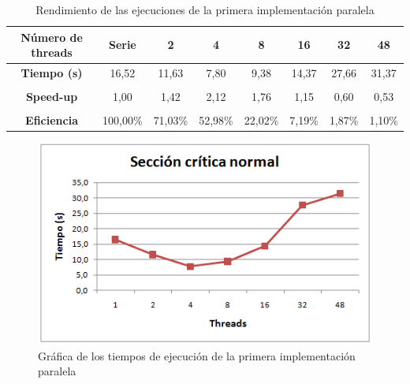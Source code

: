 \begin{table}[h]
	\small
	\centering
	\captionsetup{justification=centering}
	\begin{tabular}{cccccccc}
		\hline
		\multicolumn{1}{|c|}{{\bf N\'{u}mero de threads}} & \multicolumn{1}{c|}{{\bf Serie}} & \multicolumn{1}{c|}{{\bf 2}} & \multicolumn{1}{c|}{{\bf 4}} & \multicolumn{1}{c|}{{\bf 8}} & \multicolumn{1}{c|}{{\bf 16}} & \multicolumn{1}{c|}{{\bf 32}} & \multicolumn{1}{c|}{{\bf 48}} \\ \hline
		\multicolumn{1}{|c|}{{\bf Tiempo (s)}}           & \multicolumn{1}{c|}{16,52}      & \multicolumn{1}{c|}{11,63}  & \multicolumn{1}{c|}{7,80}   & \multicolumn{1}{c|}{9,38}   & \multicolumn{1}{c|}{14,37}   & \multicolumn{1}{c|}{27,66}   & \multicolumn{1}{c|}{31,37}   \\ \hline
		\multicolumn{1}{l}{}                         & \multicolumn{1}{l}{}             & \multicolumn{1}{l}{}         & \multicolumn{1}{l}{}         & \multicolumn{1}{l}{}         & \multicolumn{1}{l}{}          & \multicolumn{1}{l}{}          & \multicolumn{1}{l}{}          \\ \hline
		\multicolumn{1}{|c|}{{\bf Speed-up}}         & \multicolumn{1}{c|}{1,00}        & \multicolumn{1}{c|}{1,42}    & \multicolumn{1}{c|}{2,12}    & \multicolumn{1}{c|}{1,76}    & \multicolumn{1}{c|}{1,15}     & \multicolumn{1}{c|}{0,60}     & \multicolumn{1}{c|}{0,53}     \\ \hline
		{\bf }                                       &                                  &                              &                              &                              &                               &                               &                               \\ \hline
		\multicolumn{1}{|c|}{{\bf Eficiencia}}       & \multicolumn{1}{c|}{100,00\%}    & \multicolumn{1}{c|}{71,03\%} & \multicolumn{1}{c|}{52,98\%} & \multicolumn{1}{c|}{22,02\%} & \multicolumn{1}{c|}{7,19\%}   & \multicolumn{1}{c|}{1,87\%}   & \multicolumn{1}{c|}{1,10\%}   \\ \hline
	\end{tabular}
	\caption{Rendimiento de las ejecuciones de la primera implementaci\'{o}n paralela}
\end{table}	


\begin{figure}[H]
 	\captionsetup{justification=centering}
 	\centering
 	\includegraphics[width=.7\textwidth]{./imagenes/grafico1Imple}
 	\caption{Gr\'{a}fica de los tiempos de ejecuci\'{o}n de la primera implementaci\'{o}n paralela}	
 	\label{grafico1Imple}
\end{figure}

